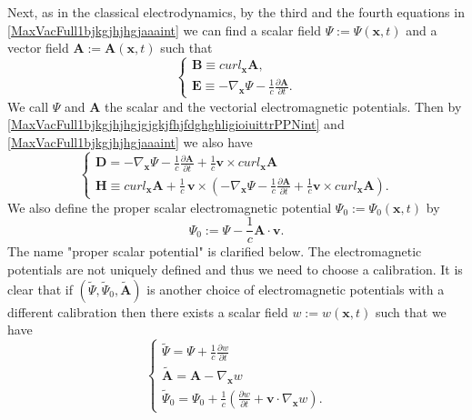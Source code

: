 \documentclass{article}
\theoremstyle{definition}
\theoremstyle{remark}
\renewcommand{\vec}[1]{\mathbf{#1}}
\newcommand{\er}{\eqref}
\newcommand{\er}{\eqref}
\begin{document}
Next, as in the classical electrodynamics, by the third and the
fourth equations in \er{MaxVacFull1bjkgjhjhgjaaaint} we can find a
scalar field $\Psi:=\Psi(\vec x,t)$ and a vector field $\vec A:=\vec
A(\vec x,t)$ such that
\begin{equation}\label{MaxVacFull1bjkgjhjhgjgjgkjfhjfdghghligioiuittrPPNint}
\begin{cases}
\vec B\equiv curl_{\vec x} \vec A,\\
\vec E\equiv-\nabla_{\vec x}\Psi-\frac{1}{c}\frac{\partial\vec
A}{\partial t}.
\end{cases}
\end{equation}
We call $\Psi$ and $\vec A$ the scalar and the vectorial
electromagnetic potentials. Then by
\er{MaxVacFull1bjkgjhjhgjgjgkjfhjfdghghligioiuittrPPNint} and
\er{MaxVacFull1bjkgjhjhgjaaaint} we also have
\begin{equation}\label{vhfffngghPPN333yuyuint}
\begin{cases}
\vec D=-\nabla_{\vec x}\Psi-\frac{1}{c}\frac{\partial\vec
A}{\partial t}+\frac{1}{c}\vec
v\times curl_{\vec x}\vec A\\
\vec H\equiv curl_{\vec x} \vec A+\frac{1}{c}\,\vec
v\times\left(-\nabla_{\vec x}\Psi-\frac{1}{c}\frac{\partial\vec
A}{\partial t}+\frac{1}{c}\vec v\times curl_{\vec x}\vec A\right).
\end{cases}
\end{equation}
We also define the proper scalar electromagnetic potential
$\Psi_0:=\Psi_0(\vec x,t)$ by
\begin{equation}\label{vhfffngghhjghhgPPNghghghutghffugghjhjkjjklint}
\Psi_0:=\Psi-\frac{1}{c}\vec A\cdot\vec v.
\end{equation}
The name "proper scalar potential" is clarified below. The
electromagnetic potentials are not uniquely defined and thus we need
to choose a calibration. It is clear that if
$(\tilde\Psi,\tilde\Psi_0,\tilde{\vec A})$ is another choice of
electromagnetic potentials with a different calibration then there
exists a scalar field $w:=w(\vec x,t)$ such that we have
\begin{equation}\label{MaxVacFull1bjkgjhjhgjgjgkjfhjfdghghligioiuittrPPNhjkjhkjgghhjjhjint}
\begin{cases}
\tilde\Psi=\Psi+\frac{1}{c}\frac{\partial w}{\partial t}\\
\tilde{\vec A}=\vec A-\nabla_{\vec x}w\\
\tilde\Psi_0=\Psi_0+\frac{1}{c}\left(\frac{\partial w}{\partial
t}+\vec v\cdot\nabla_{\vec x}w\right).
\end{cases}
\end{equation}
\end{document}
